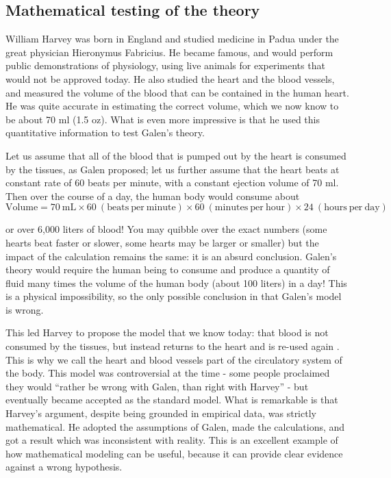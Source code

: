 \documentclass[
  letterpaper,
  DIV=11,
  numbers=noendperiod]{scrreprt}
\begin{document}
\hypertarget{mathematical-testing-of-the-theory}{%
\subsection{Mathematical testing of the
theory}\label{mathematical-testing-of-the-theory}}

William Harvey  was born in England and studied
medicine in Padua under the great physician Hieronymus Fabricius. He
became famous, and would perform public demonstrations of physiology,
using live animals for experiments that would not be approved today. He
also studied the heart and the blood vessels, and measured the volume of
the blood that can be contained in the human heart. He was quite
accurate in estimating the correct volume, which we now know to be about
70 ml (1.5 oz). What is even more impressive is that he used this
quantitative information to test Galen's theory.

Let us assume that all of the blood that is pumped out by the heart is
consumed by the tissues, as Galen proposed; let us further assume that
the heart beats at constant rate of 60 beats per minute, with a constant
ejection volume of 70 ml. Then over the course of a day, the human body
would consume about
\[\mathrm{Volume} = 70 \ \mathrm {mL} \times 60 \ \mathrm {(beats \ per \ minute)} \times 60 \ \mathrm {(minutes \ per \ hour)}  \times 24 \ \mathrm {(hours \ per \ day)}\]

or over 6,000 liters of blood! You may quibble over the exact numbers
(some hearts beat faster or slower, some hearts may be larger or
smaller) but the impact of the calculation remains the same: it is an
absurd conclusion. Galen's theory would require the human being to
consume and produce a quantity of fluid many times the volume of the
human body (about 100 liters) in a day! This is a physical
impossibility, so the only possible conclusion in that Galen's model is
wrong.

This led Harvey to propose the model that
we know today: that blood is not consumed by the tissues, but instead
returns to the heart and is re-used again \cite{schultz_william_2002}.
This is why we call the heart and blood vessels part of the circulatory
system of the body. This model was controversial at the time - some
people proclaimed they would ``rather be wrong with Galen, than right
with Harvey'' - but eventually became accepted as the standard model.
What is remarkable is that Harvey's argument, despite being grounded in
empirical data, was strictly mathematical. He adopted the assumptions of
Galen, made the calculations, and got a result which was inconsistent
with reality. This is an excellent example of how mathematical modeling
can be useful, because it can provide clear evidence against a wrong
hypothesis.
\end{document}
